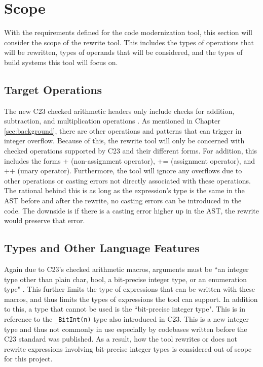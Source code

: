 \section{Scope}
\label{subsec:scope}

With the requirements defined for the code modernization tool, this section will consider the scope of the rewrite tool. This includes the types of operations that will be rewritten, types of operands that will be considered, and the types of build systems this tool will focus on.

\subsection{Target Operations}

The new C23 checked arithmetic headers only include checks for addition, subtraction, and multiplication operations \cite{ckd_arith}. As mentioned in Chapter \ref{sec:background}, there are other operations and patterns that can trigger in integer overflow. Because of this, the rewrite tool will only be concerned with checked operations supported by C23 and their different forms. For addition, this includes the forms + (non-assignment operator), += (assignment operator), and ++ (unary operator). Furthermore, the tool will ignore any overflows due to other operations or casting errors not directly associated with these operations. The rational behind this is as long as the expression's type is the same in the AST before and after the rewrite, no casting errors can be introduced in the code. The downside is if there is a casting error higher up in the AST, the rewrite would preserve that error.

\subsection{Types and Other Language Features}

Again due to C23's checked arithmetic macros, arguments must be ``an integer type other than plain char, bool, a bit-precise integer type, or an enumeration type" \cite{ckd_arith}. This further limits the type of expressions that can be written with these macros, and thus limits the types of expressions the tool can support. In addition to this, a type that cannot be used is the ``bit-precise integer type". This is in reference to the \texttt{\_BitInt(n)} type also introduced in C23. This is a new integer type and thus not commonly in use especially by codebases written before the C23 standard was published. As a result, how the tool rewrites or does not rewrite expressions involving bit-precise integer types is considered out of scope for this project.

